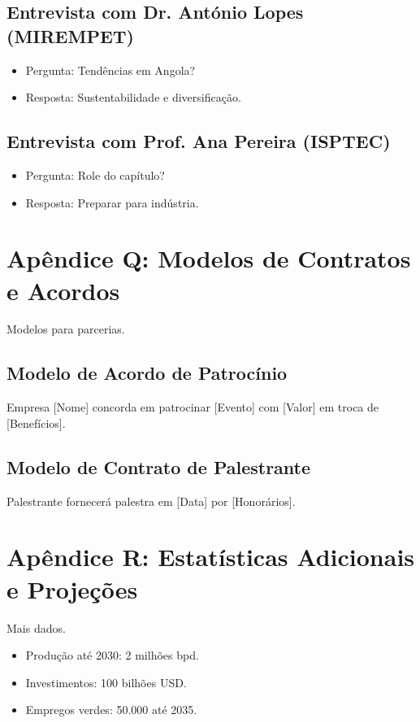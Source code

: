 \documentclass[12pt]{article}
\begin{document}
\subsection{Entrevista com Dr. António Lopes (MIREMPET)}
\begin{itemize}
    \item Pergunta: Tendências em Angola?
    \item Resposta: Sustentabilidade e diversificação.
\end{itemize}

\subsection{Entrevista com Prof. Ana Pereira (ISPTEC)}
\begin{itemize}
    \item Pergunta: Role do capítulo?
    \item Resposta: Preparar para indústria.
\end{itemize}

\clearpage
\section{Apêndice Q: Modelos de Contratos e Acordos}

Modelos para parcerias.

\subsection{Modelo de Acordo de Patrocínio}
Empresa [Nome] concorda em patrocinar [Evento] com [Valor] em troca de [Benefícios].

\subsection{Modelo de Contrato de Palestrante}
Palestrante fornecerá palestra em [Data] por [Honorários].

\clearpage
\section{Apêndice R: Estatísticas Adicionais e Projeções}

Mais dados.
\begin{itemize}
    \item Produção até 2030: 2 milhões bpd.
    \item Investimentos: 100 bilhões USD.
    \item Empregos verdes: 50.000 até 2035.
\end{itemize}
\end{document}
